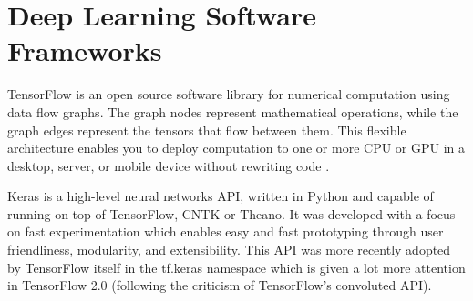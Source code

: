 
\section{Deep Learning Software Frameworks}

TensorFlow is an open source software library for numerical computation using data flow graphs. The graph nodes represent mathematical operations, while the graph edges represent the tensors that flow between them. This flexible architecture enables you to deploy computation to one or more CPU or GPU in a desktop, server, or mobile device without rewriting code \cite{tensorflow}.

Keras is a high-level neural networks API, written in Python and capable of running on top of TensorFlow, CNTK or Theano. It was developed with a focus on fast experimentation which enables easy and fast prototyping through user friendliness, modularity, and extensibility. This API was more recently adopted by TensorFlow itself in the tf.keras namespace which is given a lot more attention in TensorFlow 2.0 (following the criticism of TensorFlow's convoluted API).

